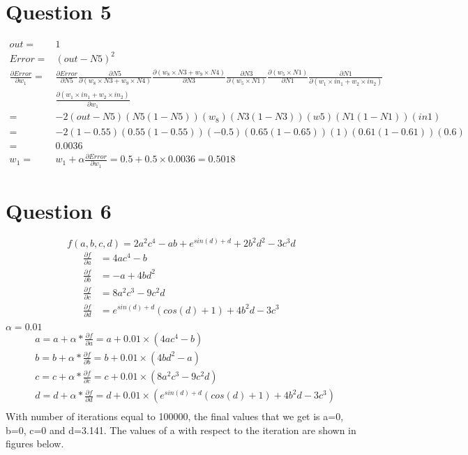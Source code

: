 \documentclass[letter, 10pt]{article}
\begin{document}
\section*{Question 5}
\begin{align*}
    out =& 1\\
    Error =& (out - N5)^2\\
    \frac{\partial Error}{\partial w_1} =& \frac{\partial Error}{\partial N5}\frac{\partial N5}{\partial (w_8\times N3 + w_9\times N4)}\frac{\partial (w_8\times N3 + w_9\times N4)}{\partial N3}\frac{\partial N3}{\partial (w_5\times N1)}\frac{\partial (w_5\times N1)}{\partial N1}\frac{\partial N1}{\partial (w_1\times in_1 + w_2\times in_2)}\\
    &\frac{\partial (w_1\times in_1 + w_2\times in_2)}{\partial w_1}\\
    =& -2(out - N5)(N5(1-N5))(w_8)(N3(1-N3))(w5)(N1(1-N1))(in1)\\
    =& -2(1-0.55)(0.55(1-0.55))(-0.5)(0.65(1-0.65))(1)(0.61(1-0.61))(0.6)\\
    =& 0.0036\\
    w_1 =& w_1 + \alpha \frac{\partial Error}{\partial w_1} = 0.5 + 0.5\times0.0036 = 0.5018
\end{align*}
\newpage

\section*{Question 6}
\begin{equation*}
    f(a,b,c,d) = 2a^2c^4 - ab + e^{sin(d)+d} + 2b^2d^2 - 3c^3d
\end{equation*}
\begin{align*}
    \frac{\partial f}{\partial a} &= 4ac^4 - b\\
    \frac{\partial f}{\partial b} &= - a + 4bd^2\\
    \frac{\partial f}{\partial c} &= 8a^2c^3 - 9c^2d\\
    \frac{\partial f}{\partial d} &= e^{sin(d)+d}(cos(d) + 1) + 4b^2d - 3c^3\\
\end{align*}
$\alpha = 0.01$
\begin{align*}
    & a = a + \alpha* \frac{\partial f}{\partial a} = a + 0.01\times(4ac^4 - b)\\
    & b = b + \alpha* \frac{\partial f}{\partial b} = b + 0.01\times(4bd^2 - a)\\
    & c = c + \alpha* \frac{\partial f}{\partial c} = c + 0.01\times(8a^2c^3 - 9c^2d)\\
    & d = d + \alpha* \frac{\partial f}{\partial d} = d + 0.01\times(e^{sin(d)+d}(cos(d) + 1) + 4b^2d - 3c^3)\\
\end{align*}
With number of iterations equal to 100000, the final values that we get is a=0, b=0, c=0 and d=3.141. The values of a with respect to the iteration are shown in figures below.
\newpage
\end{document}
